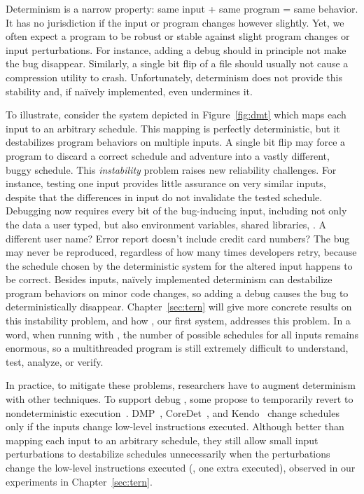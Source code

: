  Determinism is a
narrow property: same input + same program = same behavior. It has no
jurisdiction if the input or program changes however slightly.  Yet, we
often expect a program to be robust or stable against slight program
changes or input perturbations.  For instance, adding a debug 
should in principle not make the bug disappear.  Similarly, a single bit flip of
a file should usually not cause a compression utility to crash. Unfortunately,
determinism does not provide this stability and, if na\"{i}vely implemented,
even undermines it.

To illustrate, consider the system depicted in
Figure~\ref{fig:dmt} which maps each input to an arbitrary schedule. This
mapping is perfectly deterministic, but it destabilizes program
behaviors on multiple inputs.  A single bit flip may force a program to
discard a correct schedule and adventure into a vastly different, buggy
schedule. This \emph{instability} problem raises new reliability challenges. 
For instance, testing one input provides little assurance on very similar
inputs, despite that the differences in input do not invalidate the tested
schedule. Debugging now requires every bit of the bug-inducing input, including
not only the data a user typed, but also environment variables, shared
libraries, \etc. A different user name?  Error report doesn't include credit
card numbers? The bug may never be reproduced, regardless of how many times
developers retry, because the schedule chosen by the deterministic system for
the altered input happens to be correct. Besides inputs, na\"{i}vely implemented
determinism can destabilize program behaviors on minor code changes, so adding a
debug  causes the bug to deterministically disappear.
Chapter~\ref{sec:tern} will give more concrete results on this
instability problem, and how \tern, our first \smt system, addresses this
problem. In a word, when running with \dmt, the number of possible schedules for
all inputs remains enormous, so a multithreaded program is still extremely
difficult to understand, test, analyze, or verify.

In practice, to mitigate these problems, researchers have to augment
determinism with other techniques.  To support debug , some
propose to temporarily revert to nondeterministic
execution~\cite{dmp:asplos09}.  DMP~\cite{dmp:asplos09},
CoreDet~\cite{coredet:asplos10}, and Kendo~\cite{kendo:asplos09} change
schedules only if the inputs change low-level instructions executed.
Although better than mapping each input to an arbitrary schedule, they
still allow small input perturbations to destabilize schedules
unnecessarily when the perturbations change the low-level instructions
executed (\eg, one extra  executed), observed in our
experiments in Chapter~\ref{sec:tern}.

